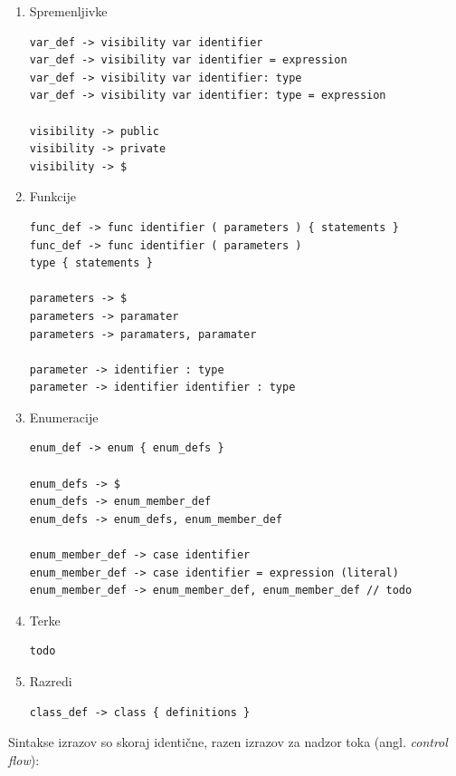 \documentclass[a4paper, 12pt]{book}
\begin{document}
\begin{enumerate}
	\item Spremenljivke
\begin{lstlisting}[]
var_def -> visibility var identifier 
var_def -> visibility var identifier = expression
var_def -> visibility var identifier: type 
var_def -> visibility var identifier: type = expression 

visibility -> public
visibility -> private
visibility -> $
\end{lstlisting}
	\item Funkcije
\begin{lstlisting}[]
func_def -> func identifier ( parameters ) { statements }
func_def -> func identifier ( parameters ) 
type { statements }

parameters -> $
parameters -> paramater
parameters -> paramaters, paramater

parameter -> identifier : type
parameter -> identifier identifier : type
\end{lstlisting}	
	\item Enumeracije
	
\begin{lstlisting}
enum_def -> enum { enum_defs }

enum_defs -> $
enum_defs -> enum_member_def
enum_defs -> enum_defs, enum_member_def

enum_member_def -> case identifier
enum_member_def -> case identifier = expression (literal)
enum_member_def -> enum_member_def, enum_member_def // todo
\end{lstlisting}
	\item Terke
\begin{lstlisting}
todo
\end{lstlisting}
	\item Razredi
\begin{lstlisting}
class_def -> class { definitions }
\end{lstlisting}

\end{enumerate} 

Sintakse izrazov so skoraj identične, razen izrazov za nadzor toka (angl. \textit{control flow}):
\end{document}
